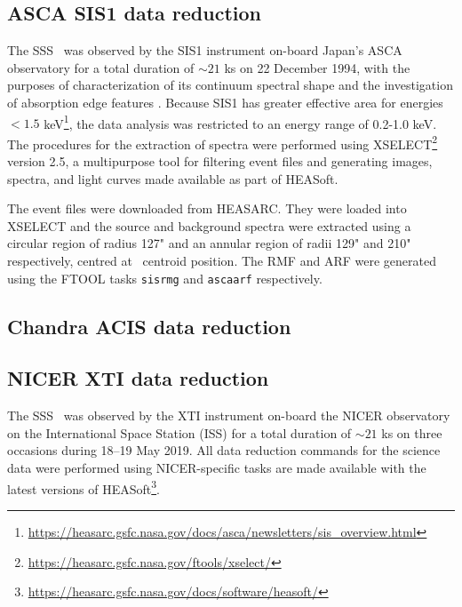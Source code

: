     \subsection{ASCA SIS1 data reduction}
    	The SSS \source\ was observed by the SIS1 instrument on-board Japan's ASCA observatory for a total duration of $\sim 21$ ks on 22 December 1994, with the purposes of characterization of its continuum spectral shape and the investigation of absorption edge features \cite{ebisawaAsca2001ApJ}. Because SIS1 has greater effective area for energies $<1.5$ keV\footnote{\url{https://heasarc.gsfc.nasa.gov/docs/asca/newsletters/sis_overview.html}}, the data analysis was restricted to an energy range of 0.2-1.0 keV. The procedures for the extraction of spectra were performed using XSELECT\footnote{\url{https://heasarc.gsfc.nasa.gov/ftools/xselect/}} version 2.5, a multipurpose tool for filtering event files and generating images, spectra, and light curves made available as part of HEASoft.
    	
    	The event files were downloaded from HEASARC. They were loaded into XSELECT and the source and background spectra were extracted using a circular region of radius 127" and an annular region of radii 129" and 210" respectively, centred at \source\ centroid position. The RMF and ARF were generated using the FTOOL tasks \texttt{sisrmg} and \texttt{ascaarf} respectively.
    
    \subsection{Chandra ACIS data reduction}
    
    \subsection{NICER XTI data reduction}
    	The SSS \source\ was observed by the XTI instrument on-board the NICER observatory on the International Space Station (ISS) for a total duration of $\sim 21$ ks on three occasions during 18--19 May 2019. All data reduction commands for the science data were performed using NICER-specific tasks are made available with the latest versions of HEASoft\footnote{\url{https://heasarc.gsfc.nasa.gov/docs/software/heasoft/}}.
    	
